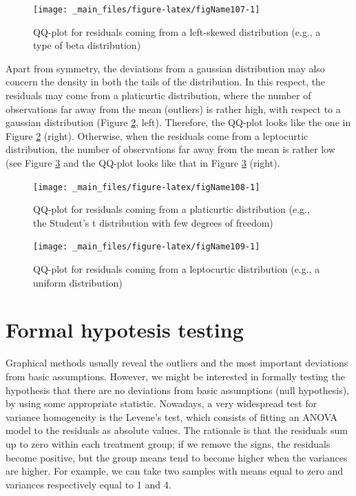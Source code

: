 \documentclass[a4paper,12pt,oneside]{book}
\begin{document}
\begin{figure}

{\centering \texttt{[image: \_main\_files/figure-latex/figName107-1]} 

}

\caption{QQ-plot for residuals coming from a left-skewed distribution (e.g., a type of beta distribution)}\label{fig:figName107}
\end{figure}

Apart from symmetry, the deviations from a gaussian distribution may also concern the density in both the tails of the distribution. In this respect, the residuals may come from a platicurtic distribution, where the number of observations far away from the mean (outliers) is rather high, with respect to a gaussian distribution (Figure \ref{fig:figName108}, left). Therefore, the QQ-plot looks like the one in Figure \ref{fig:figName108} (right). Otherwise, when the residuals come from a leptocurtic distribution, the number of observations far away from the mean is rather low (see Figure \ref{fig:figName109} and the QQ-plot looks like that in Figure \ref{fig:figName109} (right).

\begin{figure}

{\centering \texttt{[image: \_main\_files/figure-latex/figName108-1]} 

}

\caption{QQ-plot for residuals coming from a platicurtic distribution (e.g., the Student's t distribution with few degrees of freedom)}\label{fig:figName108}
\end{figure}

\begin{figure}

{\centering \texttt{[image: \_main\_files/figure-latex/figName109-1]} 

}

\caption{QQ-plot for residuals coming from a leptocurtic distribution (e.g., a uniform distribution)}\label{fig:figName109}
\end{figure}

\hypertarget{formal-hypotesis-testing}{%
\section{Formal hypotesis testing}\label{formal-hypotesis-testing}}

Graphical methods usually reveal the outliers and the most important deviations from basic assumptions. However, we might be interested in formally testing the hypothesis that there are no deviations from basic assumptions (null hypothesis), by using some appropriate statistic. Nowadays, a very widespread test for variance homogeneity is the Levene's test, which consists of fitting an ANOVA model to the residuals as absolute values. The rationale is that the residuals sum up to zero within each treatment group; if we remove the signs, the residuals become positive, but the group means tend to become higher when the variances are higher. For example, we can take two samples with means equal to zero and variances respectively equal to 1 and 4.
\end{document}
